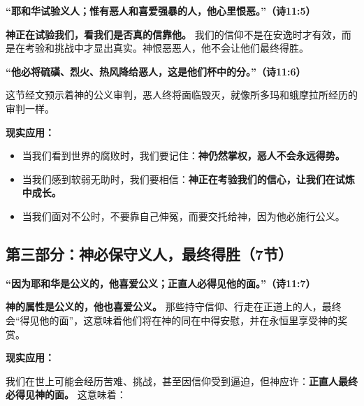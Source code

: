 \documentclass[a4paper, 12pt]{article}
\begin{document}
\vspace{0.2cm}

\textbf{“耶和华试验义人；惟有恶人和喜爱强暴的人，他心里恨恶。”（诗11:5）  }

\vspace{0.2cm}

\textbf{神正在试验我们，看我们是否真的信靠他。} 我们的信仰不是在安逸时才有效，而是在考验和挑战中才显出真实。神恨恶恶人，他不会让他们最终得胜。  
 

\vspace{0.2cm}

\textbf{“他必将硫磺、烈火、热风降给恶人，这是他们杯中的分。”（诗11:6）   }

\vspace{0.2cm}

这节经文预示着神的公义审判，恶人终将面临毁灭，就像所多玛和蛾摩拉所经历的审判一样。  


\vspace{0.2cm}

\textbf{现实应用： }


\begin{itemize}
    \item 当我们看到世界的腐败时，我们要记住：\textbf{神仍然掌权，恶人不会永远得势。} 
    \item  当我们感到软弱无助时，我们要相信：\textbf{神正在考验我们的信心，让我们在试炼中成长。  }
    \item 当我们面对不公时，不要靠自己伸冤，而要交托给神，因为他必施行公义。  
\end{itemize}



\subsection*{第三部分：神必保守义人，最终得胜（7节）}

\textbf{“因为耶和华是公义的，他喜爱公义；正直人必得见他的面。”（诗11:7）  }


\vspace{0.2cm}

\textbf{神的属性是公义的，他也喜爱公义。 }那些持守信仰、行走在正道上的人，最终会“得见他的面”，这意味着他们将在神的同在中得安慰，并在永恒里享受神的奖赏。  


\vspace{0.2cm}

\textbf{现实应用：}

我们在世上可能会经历苦难、挑战，甚至因信仰受到逼迫，但神应许：\textbf{正直人最终必得见神的面。} 这意味着：  
\end{document}
